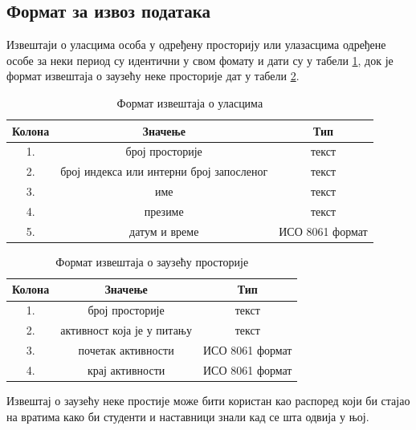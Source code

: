 \documentclass[a4paper, 12pt, diplomski]{etfcyr}
\begin{document}
			\subsection{Формат за извоз података}
				\begin{justify}
					Извештаји о уласцима особа у одређену просторију или улазасцима одређене особе за неки период су идентични у свом фомату и дати су у табели \ref{table:4}, док је формат извештаја о заузећу неке просторије дат у табели \ref{table:5}.
					\begin{table}[H]
						\centering
						\begin{tabular}{ c|c|c }
							Колона & Значење & Тип \\
							\hline\hline
							1. & број просторије & текст \\
							2. & број индекса или интерни број запосленог & текст \\
							3. & име & текст \\
							4. & презиме & текст \\
							5. & датум и време & ИСО 8061 формат \\
							\hline
						\end{tabular}
						\caption{Формат извештаја о уласцима}
						\label{table:4}
					\end{table}
					\begin{table}[H]
						\centering
						\begin{tabular}{ c|c|c }
							Колона & Значење & Тип \\
							\hline\hline
							1. & број просторије & текст \\
							2. & активност која је у питању & текст \\
							3. & почетак активности & ИСО 8061 формат \\
							4. & крај активности & ИСО 8061 формат \\
							\hline
						\end{tabular}
						\caption{Формат извештаја о заузећу просторије}
						\label{table:5}
					\end{table}
					Извештај о заузећу неке простије може бити користан као распоред који би стајао на вратима како би студенти и наставници знали кад се шта одвија у њој.
				\end{justify}
\end{document}
